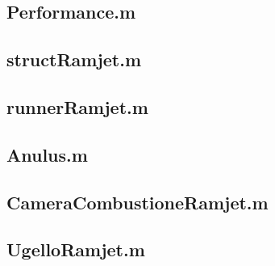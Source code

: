 \subsection{Performance.m}

\subsection{structRamjet.m}

\subsection{runnerRamjet.m}

\subsection{Anulus.m}

\subsection{CameraCombustioneRamjet.m}

\subsection{UgelloRamjet.m}



